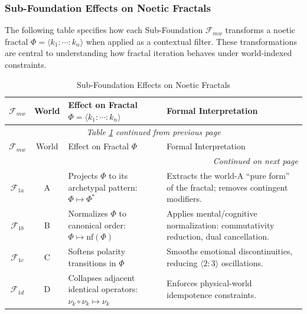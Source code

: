 \documentclass[11pt,twoside,openright]{book}
\theoremstyle{definition}
\theoremstyle{plain}
\theoremstyle{remark}
\newcommand{\Foundations}{\mathcal{F}}
\newcommand{\noe}[1]{\nu_{#1}}
\newcommand{\Frac}{\Phi}
\begin{document}
\subsubsection{Sub-Foundation Effects on Noetic Fractals}

The following table specifies how each Sub-Foundation $\Foundations_{mw}$ transforms
a noetic fractal $\Frac = \langle k_1 : \cdots : k_n \rangle$ when applied as a
contextual filter. These transformations are central to understanding how
fractal iteration behaves under world-indexed constraints.

\begin{longtable}{c|c|p{5cm}|p{5cm}}
\caption{Sub-Foundation Effects on Noetic Fractals}
\label{tab:subfoundation-fractal-effects} \\
\toprule
$\Foundations_{mw}$ & World & Effect on Fractal $\Frac = \langle k_1 : \cdots : k_n \rangle$ & Formal Interpretation \\
\midrule
\endfirsthead
\multicolumn{4}{c}{\textit{Table \ref{tab:subfoundation-fractal-effects} continued from previous page}} \\
\toprule
$\Foundations_{mw}$ & World & Effect on Fractal $\Frac$ & Formal Interpretation \\
\midrule
\endhead
\midrule
\multicolumn{4}{r}{\textit{Continued on next page}} \\
\endfoot
\bottomrule
\endlastfoot

$\Foundations_{1a}$ & A & Projects $\Frac$ to its archetypal pattern: $\Frac \mapsto \Frac^{\ast}$ &
Extracts the world-A ``pure form'' of the fractal; removes contingent modifiers. \\

$\Foundations_{1b}$ & B & Normalizes $\Frac$ to canonical order: $\Frac \mapsto \mathrm{nf}(\Frac)$ &
Applies mental/cognitive normalization: commutativity reduction, dual cancellation. \\

$\Foundations_{1c}$ & C & Softens polarity transitions in $\Frac$ &
Smooths emotional discontinuities, reducing $\langle 2:3 \rangle$ oscillations. \\

$\Foundations_{1d}$ & D & Collapses adjacent identical operators: $\noe{k} \circ \noe{k} \mapsto \noe{k}$ &
Enforces physical-world idempotence constraints. \\

\midrule


\end{longtable}
\end{document}
